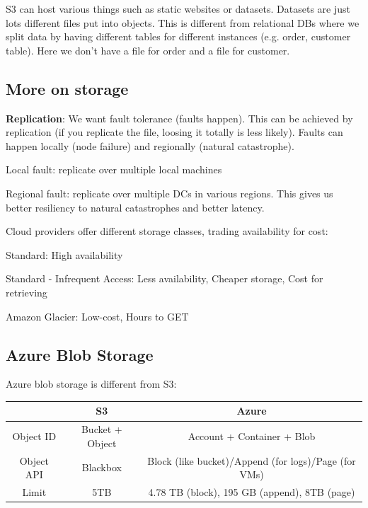 \documentclass[11pt,oneside,a4paper]{article}
\begin{document}
S3 can host various things such as static websites or datasets. Datasets are just lots different files put into objects. This is different from relational DBs where we split data by having different tables for different instances (e.g. order, customer table). Here we don't have a file for order and a file for customer.\\

\subsection{More on storage}

\textbf{Replication}: We want fault tolerance (faults happen). This can be achieved by replication (if you replicate the file, loosing it totally is less likely). Faults can happen locally (node failure) and regionally (natural catastrophe).
\begin{compactitem}
	\item Local fault: replicate over multiple local machines
	\item Regional fault: replicate over multiple DCs in various regions. This gives us better resiliency to natural catastrophes and better latency.
\end{compactitem}

Cloud providers offer different storage classes, trading availability for cost:

\begin{compactitem}
	\item Standard: High availability
	\item Standard - Infrequent Access: Less availability, Cheaper storage, Cost for retrieving
	\item Amazon Glacier: Low-cost, Hours to GET\\
\end{compactitem}

\subsection{Azure Blob Storage}

Azure blob storage is different from S3:

\begin{tabular}{|c|c|c|}
	\hline 
	& S3 & Azure \\ 
	\hline 
	Object ID & Bucket + Object & Account + Container + Blob \\ 
	\hline 
	Object API & Blackbox & Block (like bucket)/Append (for logs)/Page (for VMs)\\ 
	\hline 
	Limit & 5TB & 4.78 TB (block), 195 GB (append),	8TB (page) \\ 
	\hline
\end{tabular}\\
\end{document}

